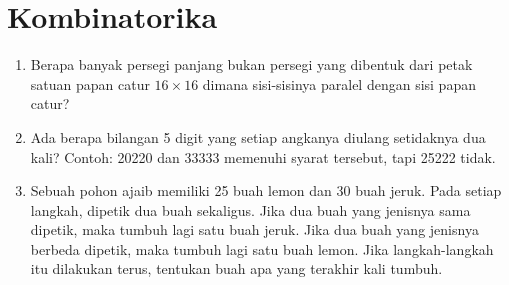 \documentclass[11pt]{scrartcl}
\begin{document}
\section{Kombinatorika}
\begin{enumerate}[resume]
    \item Berapa banyak persegi panjang bukan persegi yang dibentuk dari petak satuan papan catur $16 \times 16$ dimana sisi-sisinya paralel dengan sisi papan catur?
    
    \item Ada berapa bilangan 5 digit yang setiap angkanya diulang setidaknya dua kali? Contoh: 20220 dan 33333 memenuhi syarat tersebut, tapi 25222 tidak.

    \item Sebuah pohon ajaib memiliki 25 buah lemon dan 30 buah jeruk. Pada setiap langkah, dipetik dua buah sekaligus. Jika dua buah yang jenisnya sama dipetik, maka tumbuh lagi satu buah jeruk. Jika dua buah yang jenisnya berbeda dipetik, maka tumbuh lagi satu buah lemon. Jika langkah-langkah itu dilakukan terus, tentukan buah apa yang terakhir kali tumbuh.
\end{enumerate}
	
	
\end{document}

